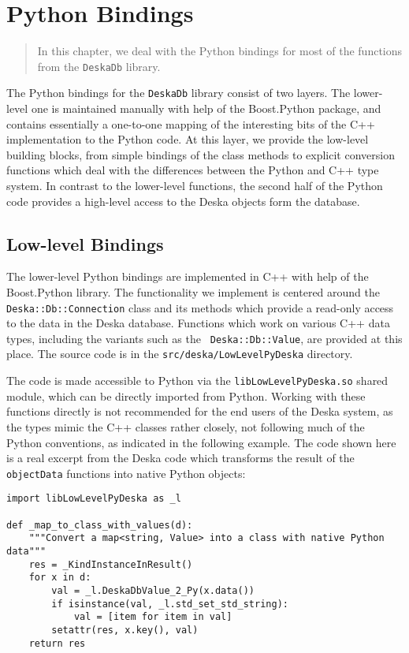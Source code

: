 \documentclass[deska]{subfiles}
\begin{document}
\chapter{Python Bindings}

\begin{abstract}
In this chapter, we deal with the Python bindings for most of the functions from the  {\tt DeskaDb} library.
\end{abstract}

The Python bindings for the {\tt DeskaDb} library consist of two layers.  The lower-level one is maintained
manually with help of the Boost.Python package, and contains essentially a one-to-one mapping of the interesting bits of
the C++ implementation to the Python code.  At this layer, we provide the low-level building blocks, from simple
bindings of the class methods to explicit conversion functions which deal with the differences between the Python and
C++ type system.  In contrast to the lower-level functions, the second half of the Python code provides a high-level
access to the Deska objects form the database.

\section{Low-level Bindings}

The lower-level Python bindings are implemented in C++ with help of the Boost.Python library.  The functionality we
implement is centered around the {\tt Deska::Db::Connection} class and its methods which provide a read-only access to
the data in the Deska database.  Functions which work on various C++ data types, including the variants such as the {\tt
Deska::Db::Value}, are provided at this place.  The source code is in the {\tt src/deska/LowLevelPyDeska} directory.

The code is made accessible to Python via the {\tt libLowLevelPyDeska.so} shared module, which can be directly imported
from Python.  Working with these functions directly is not recommended for the end users of the Deska system, as the
types mimic the C++ classes rather closely, not following much of the Python conventions, as indicated in the following
example.  The code shown here is a real excerpt from the Deska code which transforms the result of the {\tt objectData}
functions into native Python objects:

\begin{verbatim}
import libLowLevelPyDeska as _l

def _map_to_class_with_values(d):
    """Convert a map<string, Value> into a class with native Python data"""
    res = _KindInstanceInResult()
    for x in d:
        val = _l.DeskaDbValue_2_Py(x.data())
        if isinstance(val, _l.std_set_std_string):
            val = [item for item in val]
        setattr(res, x.key(), val)
    return res
\end{verbatim}
\end{document}
